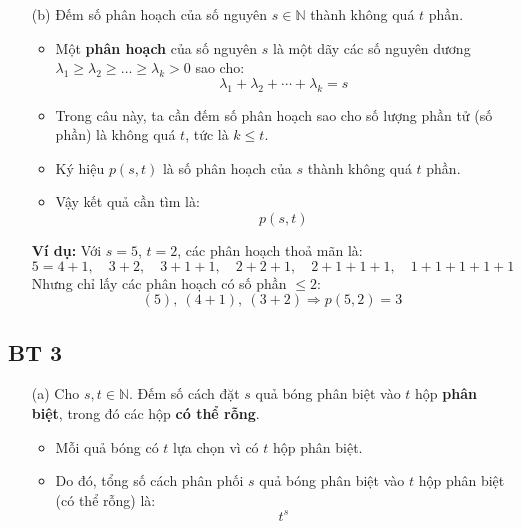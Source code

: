 \documentclass{article}
\begin{document}
	\begin{enumerate}
		\item[(b)] 
		Đếm số phân hoạch của số nguyên $s \in \mathbb{N}$ thành không quá $t$ phần.
		
		
		\begin{itemize}
			\item Một \textbf{phân hoạch} của số nguyên $s$ là một dãy các số nguyên dương $\lambda_1 \geq \lambda_2 \geq \dots \geq \lambda_k > 0$ sao cho:
			\[
			\lambda_1 + \lambda_2 + \cdots + \lambda_k = s
			\]
			\item Trong câu này, ta cần đếm số phân hoạch sao cho số lượng phần tử (số phần) là không quá $t$, tức là $k \leq t$.
			
			\item Ký hiệu \( p(s, t) \) là số phân hoạch của $s$ thành không quá $t$ phần.
			
			\item Vậy kết quả cần tìm là:
			\[
			\boxed{p(s, t)}
			\]
		\end{itemize}
		
		\textbf{Ví dụ:} Với $s = 5$, $t = 2$, các phân hoạch thoả mãn là:
		\[
		5 = 4 + 1,\quad 3 + 2,\quad 3 + 1 + 1,\quad 2 + 2 + 1,\quad 2 + 1 + 1 + 1,\quad 1 + 1 + 1 + 1 + 1
		\]
		Nhưng chỉ lấy các phân hoạch có số phần $\leq 2$:
		\[
		(5),\ (4+1),\ (3+2)
		\Rightarrow p(5, 2) = 3
		\]
	\end{enumerate}
	
	\subsection*{BT 3}
	\begin{enumerate}
		\item[(a)] 
		Cho $s, t \in \mathbb{N}$. Đếm số cách đặt $s$ quả bóng phân biệt vào $t$ hộp \textbf{phân biệt}, trong đó các hộp \textbf{có thể rỗng}.
		
		\begin{itemize}
			\item Mỗi quả bóng có $t$ lựa chọn vì có $t$ hộp phân biệt.
			\item Do đó, tổng số cách phân phối $s$ quả bóng phân biệt vào $t$ hộp phân biệt (có thể rỗng) là:
			\[
			\boxed{t^s}
			\]
		\end{itemize}
	\end{enumerate}
	
\end{document}
